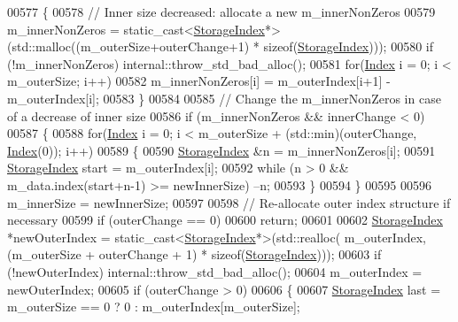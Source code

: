 \begin{DoxyCode}
00577       \{
00578         \textcolor{comment}{// Inner size decreased: allocate a new m\_innerNonZeros}
00579         m\_innerNonZeros = \textcolor{keyword}{static\_cast<}\hyperlink{group___sparse_core___module_a0b540ba724726ebe953f8c0df06081ed}{StorageIndex}*\textcolor{keyword}{>}(std::malloc((m\_outerSize+outerChange+1) * \textcolor{keyword}{
      sizeof}(\hyperlink{group___sparse_core___module_a0b540ba724726ebe953f8c0df06081ed}{StorageIndex})));
00580         \textcolor{keywordflow}{if} (!m\_innerNonZeros) internal::throw\_std\_bad\_alloc();
00581         \textcolor{keywordflow}{for}(\hyperlink{group___core___module_a554f30542cc2316add4b1ea0a492ff02}{Index} i = 0; i < m\_outerSize; i++)
00582           m\_innerNonZeros[i] = m\_outerIndex[i+1] - m\_outerIndex[i];
00583       \}
00584       
00585       \textcolor{comment}{// Change the m\_innerNonZeros in case of a decrease of inner size}
00586       \textcolor{keywordflow}{if} (m\_innerNonZeros && innerChange < 0)
00587       \{
00588         \textcolor{keywordflow}{for}(\hyperlink{group___core___module_a554f30542cc2316add4b1ea0a492ff02}{Index} i = 0; i < m\_outerSize + (std::min)(outerChange, \hyperlink{namespace_eigen_a62e77e0933482dafde8fe197d9a2cfde}{Index}(0)); i++)
00589         \{
00590           \hyperlink{group___sparse_core___module_a0b540ba724726ebe953f8c0df06081ed}{StorageIndex} &n = m\_innerNonZeros[i];
00591           \hyperlink{group___sparse_core___module_a0b540ba724726ebe953f8c0df06081ed}{StorageIndex} start = m\_outerIndex[i];
00592           \textcolor{keywordflow}{while} (n > 0 && m\_data.index(start+n-1) >= newInnerSize) --n; 
00593         \}
00594       \}
00595       
00596       m\_innerSize = newInnerSize;
00597 
00598       \textcolor{comment}{// Re-allocate outer index structure if necessary}
00599       \textcolor{keywordflow}{if} (outerChange == 0)
00600         \textcolor{keywordflow}{return};
00601           
00602       \hyperlink{group___sparse_core___module_a0b540ba724726ebe953f8c0df06081ed}{StorageIndex} *newOuterIndex = \textcolor{keyword}{static\_cast<}\hyperlink{group___sparse_core___module_a0b540ba724726ebe953f8c0df06081ed}{StorageIndex}*\textcolor{keyword}{>}(std::realloc(
      m\_outerIndex, (m\_outerSize + outerChange + 1) * \textcolor{keyword}{sizeof}(\hyperlink{group___sparse_core___module_a0b540ba724726ebe953f8c0df06081ed}{StorageIndex})));
00603       \textcolor{keywordflow}{if} (!newOuterIndex) internal::throw\_std\_bad\_alloc();
00604       m\_outerIndex = newOuterIndex;
00605       \textcolor{keywordflow}{if} (outerChange > 0)
00606       \{
00607         \hyperlink{group___sparse_core___module_a0b540ba724726ebe953f8c0df06081ed}{StorageIndex} last = m\_outerSize == 0 ? 0 : m\_outerIndex[m\_outerSize];

\end{DoxyCode}
